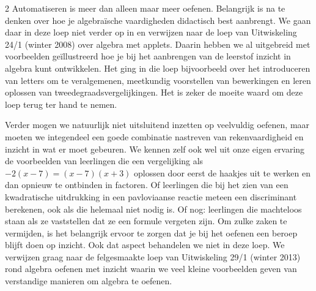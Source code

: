 \begin{multicols}{2}
Automatiseren is meer dan alleen maar meer oefenen. Belangrijk is na te denken over hoe je algebraïsche vaardigheden didactisch best aanbrengt. We gaan daar in deze loep niet verder op in en verwijzen naar de loep van Uitwiskeling 24/1 (winter 2008) over algebra met applets. Daarin hebben we al uitgebreid met voorbeelden geïllustreerd hoe je bij het aanbrengen van de leerstof inzicht in algebra kunt ontwikkelen. Het ging in die loep bijvoorbeeld over het introduceren van letters om te veralgemenen, meetkundig voorstellen van bewerkingen en leren oplossen van tweedegraadsvergelijkingen. Het is zeker de moeite waard om deze loep terug ter hand te nemen.

Verder mogen we natuurlijk niet uitsluitend inzetten op veelvuldig oefenen, maar moeten
we integendeel een goede combinatie nastreven van rekenvaardigheid en inzicht in wat er moet gebeuren. We kennen zelf ook wel uit onze eigen ervaring de voorbeelden van leerlingen die een vergelijking als $-2(x-7)=(x-7)(x+3)$ oplossen door eerst de haakjes uit te werken en dan opnieuw te ontbinden in factoren. Of leerlingen die bij het zien van een kwadratische uitdrukking in een pavloviaanse reactie meteen een discriminant berekenen, ook als die helemaal niet nodig is. Of nog: leerlingen die machteloos staan als ze vaststellen dat ze een formule vergeten zijn. Om zulke zaken te vermijden, is het belangrijk ervoor te zorgen dat je bij het oefenen een beroep blijft doen op inzicht. Ook dat aspect behandelen we niet in deze loep. We verwijzen graag naar de felgesmaakte loep van Uitwiskeling 29/1 (winter 2013) rond algebra oefenen met inzicht waarin we veel kleine voorbeelden geven van verstandige manieren om algebra te oefenen.



\end{multicols}
